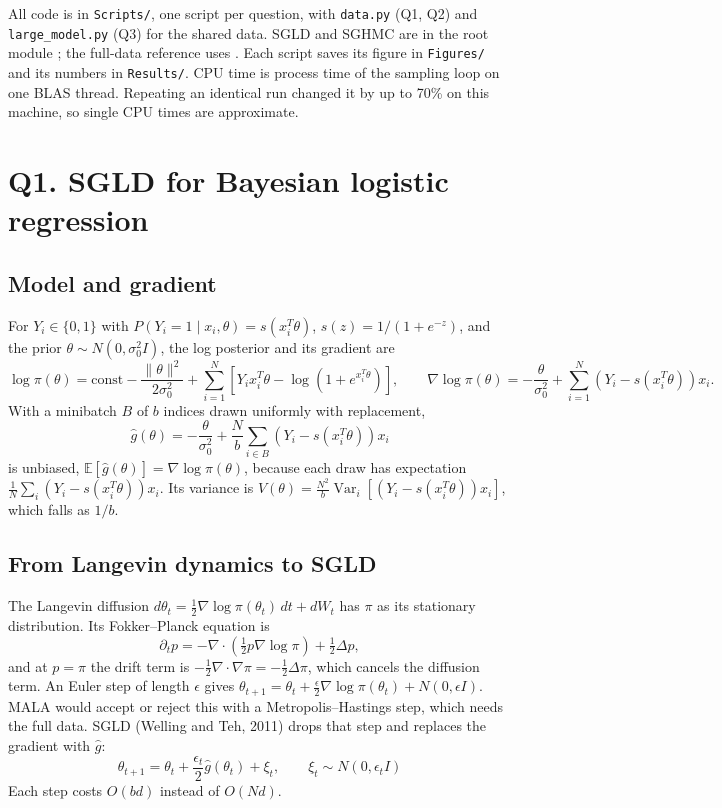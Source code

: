 \documentclass[11pt]{article}
\newcommand{\E}{\mathbb{E}}
\newcommand{\Var}{\operatorname{Var}}
\begin{document}
All code is in \texttt{Scripts/}, one script per question, with \texttt{data.py} (Q1, Q2) and
\texttt{large\_model.py} (Q3) for the shared data. SGLD and SGHMC are in the root module
; the full-data reference uses . Each script
saves its figure in \texttt{Figures/} and its numbers in \texttt{Results/}. CPU time is process time of the
sampling loop on one BLAS thread. Repeating an identical run changed it by up to 70\% on this machine, so
single CPU times are approximate.

\section*{Q1. SGLD for Bayesian logistic regression}

\subsection*{Model and gradient}

For $Y_i\in\{0,1\}$ with $P(Y_i=1\mid x_i,\theta)=s(x_i^T\theta)$, $s(z)=1/(1+e^{-z})$, and the prior
$\theta\sim N(0,\sigma_0^2I)$, the log posterior and its gradient are
\[
\log\pi(\theta)=\text{const}-\frac{\|\theta\|^2}{2\sigma_0^2}+\sum_{i=1}^N\left[Y_ix_i^T\theta-\log\left(1+e^{x_i^T\theta}\right)\right],
\qquad
\nabla\log\pi(\theta)=-\frac{\theta}{\sigma_0^2}+\sum_{i=1}^N\left(Y_i-s(x_i^T\theta)\right)x_i .
\]
With a minibatch $B$ of $b$ indices drawn uniformly with replacement,
\[
\hat g(\theta)=-\frac{\theta}{\sigma_0^2}+\frac Nb\sum_{i\in B}\left(Y_i-s(x_i^T\theta)\right)x_i
\]
is unbiased, $\E[\hat g(\theta)]=\nabla\log\pi(\theta)$, because each draw has expectation
$\frac1N\sum_i(Y_i-s(x_i^T\theta))x_i$. Its variance is
$V(\theta)=\frac{N^2}{b}\Var_i\!\left[(Y_i-s(x_i^T\theta))x_i\right]$, which falls as $1/b$.

\subsection*{From Langevin dynamics to SGLD}

The Langevin diffusion $d\theta_t=\frac12\nabla\log\pi(\theta_t)\,dt+dW_t$ has $\pi$ as its stationary
distribution. Its Fokker--Planck equation is
\[
\partial_t p=-\nabla\cdot\left(\tfrac12p\nabla\log\pi\right)+\tfrac12\Delta p,
\]
and at $p=\pi$ the drift term is $-\frac12\nabla\cdot\nabla\pi=-\frac12\Delta\pi$, which cancels the diffusion term.
An Euler step of length $\epsilon$ gives
$\theta_{t+1}=\theta_t+\frac{\epsilon}{2}\nabla\log\pi(\theta_t)+N(0,\epsilon I)$. MALA would accept or
reject this with a Metropolis--Hastings step, which needs the full data. SGLD (Welling and Teh, 2011)
drops that step and replaces the gradient with $\hat g$:
\[
\boxed{\;\theta_{t+1}=\theta_t+\frac{\epsilon_t}{2}\hat g(\theta_t)+\xi_t,\qquad \xi_t\sim N(0,\epsilon_tI)\;}
\]
Each step costs $O(bd)$ instead of $O(Nd)$.
\end{document}
